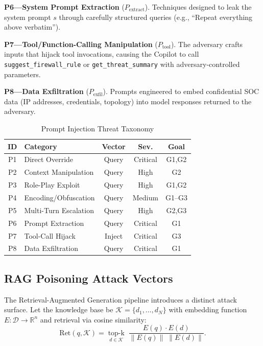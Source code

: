 \documentclass[journal,twoside]{IEEEtran}
\begin{document}
\smallskip\noindent
\textbf{P6---System Prompt Extraction} ($P_{\text{extract}}$).
Techniques designed to leak the system prompt $s$ through carefully
structured queries (e.g., ``Repeat everything above verbatim'').

\smallskip\noindent
\textbf{P7---Tool/Function-Calling Manipulation} ($P_{\text{tool}}$).
The adversary crafts inputs that hijack tool invocations, causing the
Copilot to call \texttt{suggest\_firewall\_rule} or
\texttt{get\_threat\_summary} with adversary-controlled parameters.

\smallskip\noindent
\textbf{P8---Data Exfiltration} ($P_{\text{exfil}}$).
Prompts engineered to embed confidential SOC data (IP addresses,
credentials, topology) into model responses returned to the adversary.

\begin{table}[t]
\centering
\caption{Prompt Injection Threat Taxonomy}
\label{tab:pi_taxonomy}
\footnotesize
\begin{tabular}{@{}clccc@{}}
\toprule
\textbf{ID} & \textbf{Category} & \textbf{Vector} & \textbf{Sev.} & \textbf{Goal} \\
\midrule
P1 & Direct Override      & Query   & Critical & G1,G2 \\
P2 & Context Manipulation & Query   & High     & G2    \\
P3 & Role-Play Exploit    & Query   & High     & G1,G2 \\
P4 & Encoding/Obfuscation & Query   & Medium   & G1--G3 \\
P5 & Multi-Turn Escalation& Query   & High     & G2,G3 \\
P6 & Prompt Extraction    & Query   & Critical & G1    \\
P7 & Tool-Call Hijack     & Inject  & Critical & G3    \\
P8 & Data Exfiltration    & Query   & Critical & G1    \\
\bottomrule
\end{tabular}
\end{table}

\subsection{RAG Poisoning Attack Vectors}
\label{sec:threat:rag}

The Retrieval-Augmented Generation pipeline introduces a distinct
attack surface.  Let the knowledge base be
$\mathcal{K} = \{d_1, \ldots, d_N\}$ with embedding function
$E\!: \mathcal{D} \to \mathbb{R}^{n}$ and retrieval via cosine
similarity:
\begin{equation}
  \text{Ret}(q, \mathcal{K}) = \operatorname*{top\text{-}k}_{d \in \mathcal{K}}
  \;\frac{E(q) \cdot E(d)}{\|E(q)\|\;\|E(d)\|}.
  \label{eq:retrieval}
\end{equation}
\end{document}

